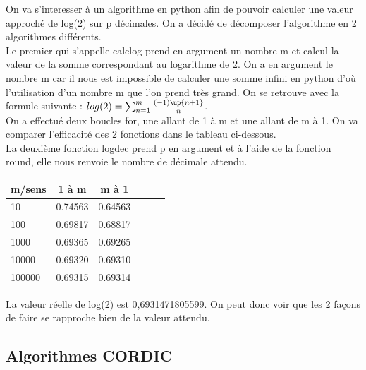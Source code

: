 \documentclass{article}
\begin{document}
On va s'interesser à un algorithme en python afin de pouvoir calculer une valeur approché de log(2) sur p décimales. On a décidé de décomposer l'algorithme en 2 algorithmes différents. \\

Le premier qui s'appelle calclog prend en argument un nombre m et calcul la valeur de la somme correspondant au logarithme de 2. 
On a en argument le nombre m car il nous est impossible de calculer une somme infini en python d'où l'utilisation d'un nombre m que l'on prend très grand. On se retrouve avec la formule suivante : 
\begin{math}
log(2) = \sum_{n = 1}^m \frac{(-1)\up{n+1}}{n}.
\end{math}
\\
On a effectué deux boucles for, une allant de 1 à m et une allant de m à 1. On va comparer l'efficacité des 2 fonctions dans le tableau ci-dessous.
\\

La deuxième fonction logdec prend p en argument et à l'aide de la fonction round, elle nous renvoie le nombre de décimale attendu. \\

\begin{tabular}{|l|c|c|c|c|c|}
\hline
m/sens & 1 à m & m à 1 \\ \hline
10 & 0.74563 & 0.64563 \\ \hline
100 & 0.69817 & 0.68817 \\ \hline
1000 & 0.69365 & 0.69265 \\ \hline
10000 & 0.69320 & 0.69310 \\ \hline
100000 & 0.69315 & 0.69314 \\ \hline

\end{tabular}

La valeur réelle de log(2) est 0,6931471805599. On peut donc voir que les 2 façons de faire se rapproche bien de la valeur attendu.

\subsection{Algorithmes CORDIC}
\end{document}
